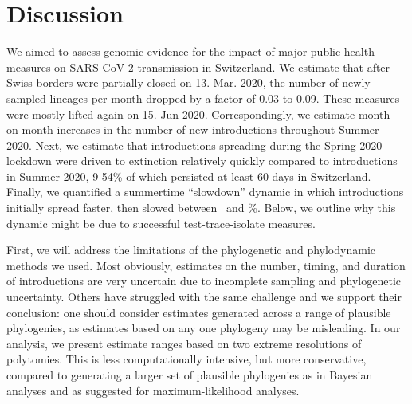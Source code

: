 \documentclass[9pt,twoside,lineno]{pnas-new} %
\begin{document}
\section{Discussion}
We aimed to assess genomic evidence for the impact of major public health measures on SARS-CoV-2 transmission in Switzerland. We estimate that after Swiss borders were partially closed on 13. Mar. 2020, the number of newly sampled lineages per month dropped by a factor of 0.03 to 0.09. These measures were mostly lifted again on 15. Jun 2020. Correspondingly, we estimate month-on-month increases in the number of new introductions throughout Summer 2020. Next, we estimate that introductions spreading during the Spring 2020 lockdown were driven to extinction relatively quickly compared to introductions in Summer 2020, 9-54\% of which persisted at least 60 days in Switzerland. Finally, we quantified a summertime ``slowdown'' dynamic in which introductions initially spread faster, then slowed between \summermaxdampingpercentmedianCHEnosampUB\ and \summermindampingpercentmedianCHEnosampUB \%. Below, we outline why this dynamic might be due to successful test-trace-isolate measures.

First, we will address the limitations of the phylogenetic and phylodynamic methods we used. Most obviously, estimates on the number, timing, and duration of introductions are very uncertain due to incomplete sampling and phylogenetic uncertainty. Others have struggled with the same challenge \cite{Morel2021} and we support their conclusion: one should consider estimates generated across a range of plausible phylogenies, as estimates based on any one phylogeny may be misleading. In our analysis, we present estimate ranges based on two extreme resolutions of polytomies. This is less computationally intensive, but more conservative, compared to generating a larger set of plausible phylogenies as in Bayesian analyses and as \cite{Morel2021} suggested for maximum-likelihood analyses.
\end{document}
